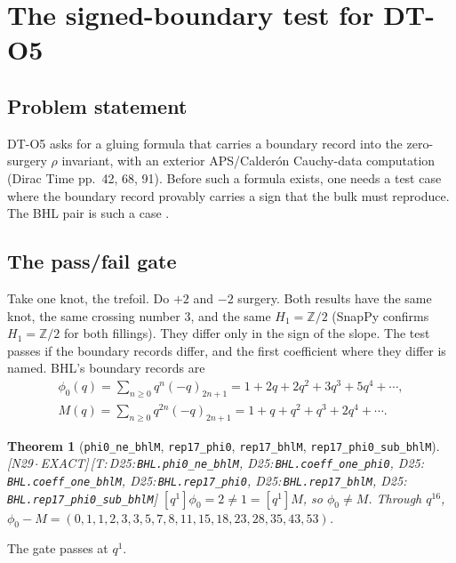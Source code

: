\documentclass[11pt]{article}
\newtheorem{theorem}{Theorem}
\theoremstyle{definition}
\newcommand{\lean}[1]{\texttt{\small #1}}
\newcommand{\dtag}[1]{#1}
\begin{document}
\section{The signed-boundary test for DT-O5}\label{sec:sbt}
\subsection{Problem statement}
DT-O5 asks for a gluing formula that carries a boundary record into the zero-surgery $\rho$ invariant, with an exterior APS/Calder\'on Cauchy-data computation (Dirac Time pp.~42, 68, 91). Before such a formula exists, one needs a test case where the boundary record provably carries a sign that the bulk must reproduce. The BHL pair is such a case \cite{BHL}.

\subsection{The pass/fail gate}
Take one knot, the trefoil. Do $+2$ and $-2$ surgery. Both results have the same knot, the same crossing number $3$, and the same $H_1=\mathbb Z/2$ (SnapPy confirms $H_1=\mathbb Z/2$ for both fillings). They differ only in the sign of the slope. The test passes if the boundary records differ, and the first coefficient where they differ is named. BHL's boundary records are
\begin{gather*} \phi_0(q)=\sum_{n\ge0}q^n(-q)_{2n+1}=1+2q+2q^2+3q^3+5q^4+\cdots,\\ M(q)=\sum_{n\ge0}q^{2n}(-q)_{2n+1}=1+q+q^2+q^3+2q^4+\cdots. \end{gather*}
\begin{theorem}[\lean{phi0\_ne\_bhlM}, \lean{rep17\_phi0}, \lean{rep17\_bhlM}, \lean{rep17\_phi0\_sub\_bhlM}]\dtag{\textsf{\small[N29\,$\cdot$\,EXACT]}\,\textsf{\small[T:\,D25:\,\lean{BHL.\allowbreak{}phi0\_\allowbreak{}ne\_\allowbreak{}bhlM}, D25:\,\lean{BHL.\allowbreak{}coeff\_\allowbreak{}one\_\allowbreak{}phi0}, D25:\,\lean{BHL.\allowbreak{}coeff\_\allowbreak{}one\_\allowbreak{}bhlM}, D25:\,\lean{BHL.\allowbreak{}rep17\_\allowbreak{}phi0}, D25:\,\lean{BHL.\allowbreak{}rep17\_\allowbreak{}bhlM}, D25:\,\lean{BHL.\allowbreak{}rep17\_\allowbreak{}phi0\_\allowbreak{}sub\_\allowbreak{}bhlM}]}}
$[q^1]\phi_0=2\neq1=[q^1]M$, so $\phi_0\neq M$. Through $q^{16}$, $\phi_0-M=(0,1,1,2,3,3,5,7,8,11,15,18,23,28,35,43,53)$.
\end{theorem}
The gate passes at $q^1$.
\end{document}
